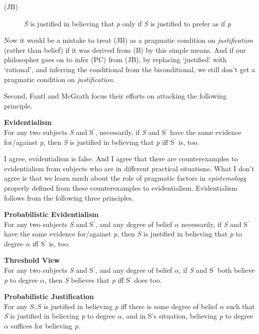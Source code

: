 \documentclass[
  11pt,
  letterpaper,
  DIV=11,
  numbers=noendperiod,
  oneside]{scrartcl}
\begin{document}
\begin{description}
\item[(JB)]
\emph{S} is justified in believing that \emph{p} only if \emph{S} is
justified to prefer as if \emph{p}
\end{description}

Now it would be a mistake to treat (JB) as a pragmatic condition on
\emph{justification} (rather than belief) if it was derived from (B) by
this simple means. And if our philosopher goes on to infer (PC) from
(JB), by replacing `justified' with `rational', and inferring the
conditional from the biconditional, we still don't get a pragmatic
condition on \emph{justification}.

Second, Fantl and McGrath focus their efforts on attacking the following
principle.

\textbf{Evidentialism}\\
For any two subjects \emph{S} and S\(^\prime\), necessarily, if \emph{S}
and S\(^\prime\) have the same evidence for/against \emph{p}, then
\emph{S} is justified in believing that \emph{p} iff S\(^\prime\) is,
too.

I agree, evidentialism is false. And I agree that there are
counterexamples to evidentialism from subjects who are in different
practical situations. What I don't agree is that we learn much about the
role of pragmatic factors in \emph{epistemology} properly defined from
these counterexamples to evidentialism. Evidentialism follows from the
following three principles.

\textbf{Probabilistic Evidentialism}\\
For any two subjects \emph{S} and S\(^\prime\), and any degree of belief
\(\alpha\) necessarily, if \emph{S} and S\(^\prime\) have the same
evidence for/against \emph{p}, then \emph{S} is justified in believing
that \emph{p} to degree \(\alpha\) iff S\(^\prime\) is, too.

\textbf{Threshold View}\\
For any two subjects \emph{S} and S\(^\prime\), and any degree of belief
\(\alpha\), if \emph{S} and S\(^\prime\) both believe \emph{p} to degree
\(\alpha\), then \emph{S} believes that \emph{p} iff S\(^\prime\) does
too.

\textbf{Probabilistic Justification}\\
For any \(S, S\) is justified in believing \emph{p} iff there is some
degree of belief \(\alpha\) such that \emph{S} is justified in believing
\emph{p} to degree \(\alpha\), and in S's situation, believing \emph{p}
to degree \(\alpha\) suffices for believing \emph{p}.
\end{document}
